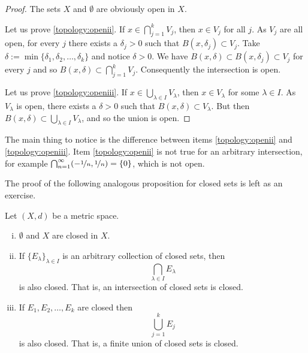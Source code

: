 \begin{proof}
The sets $X$ and $\emptyset$ are obviously open in $X$.

Let us prove \ref{topology:openii}.
If $x \in \bigcap_{j=1}^k V_j$, then $x \in V_j$ for all $j$.
As $V_j$ are all open, for every $j$ there exists a $\delta_j > 0$ 
such that $B(x,\delta_j) \subset V_j$.  Take $\delta := \min \{
\delta_1,\delta_2,\ldots,\delta_k \}$ and notice $\delta > 0$.  We have
$B(x,\delta) \subset B(x,\delta_j) \subset V_j$ for every $j$ and so
$B(x,\delta) \subset \bigcap_{j=1}^k V_j$.  Consequently the intersection is open.

Let us prove \ref{topology:openiii}.
If $x \in \bigcup_{\lambda \in I} V_\lambda$, then $x \in V_\lambda$ for some
$\lambda \in I$.
As $V_\lambda$ is open, there exists a $\delta > 0$
such that $B(x,\delta) \subset V_\lambda$.  But then
$B(x,\delta) \subset \bigcup_{\lambda \in I} V_\lambda$,
and so the union is open.
\end{proof}

\begin{example}
The main thing to notice is the difference between
items
\ref{topology:openii} and \ref{topology:openiii}.
Item \ref{topology:openii} is not true for an arbitrary intersection,
for example $\bigcap_{n=1}^\infty (-\nicefrac{1}{n},\nicefrac{1}{n}) = \{ 0
\}$, which is not open.
\end{example}


The proof of the following analogous proposition for closed sets
is left as an exercise.

\begin{prop} \label{prop:topology:closed}
Let $(X,d)$ be a metric space.
\begin{enumerate}[(i)]
\item \label{topology:closedi} $\emptyset$ and $X$ are closed in $X$.
\item \label{topology:closedii} If $\{ E_\lambda \}_{\lambda \in I}$ is
an arbitrary collection of closed sets, then
\begin{equation*}
\bigcap_{\lambda \in I} E_\lambda
\end{equation*}
is also closed.  That is, an intersection of closed sets is closed.
\item \label{topology:closediii} If $E_1, E_2, \ldots, E_k$ are closed then
\begin{equation*}
\bigcup_{j=1}^k E_j
\end{equation*}
is also closed.  That is, a finite union of closed sets is closed.
\end{enumerate}
\end{prop}

